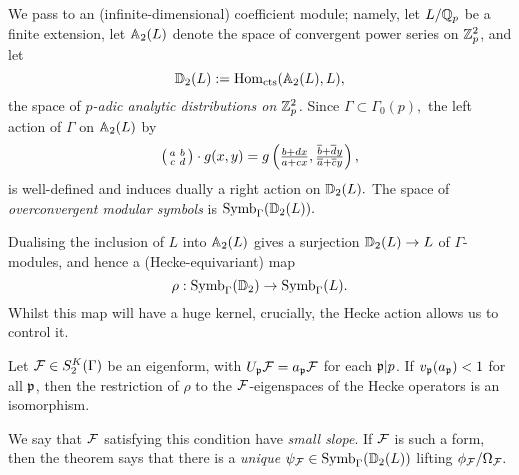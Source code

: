 \documentclass[a4paper,10pt]{article}
\numberwithin{equation}{section}
\begin{document}
We pass to an (infinite-dimensional) coefficient module; namely, let $L/\mathbb{Q}_p$ be a finite extension, let $\mathbb{A}_2(L)$ denote the space of convergent power series on $\mathbb{Z}_p^2$, and let
\[
    \mathbb{D}_2(L) := \mathrm{Hom}_{\mathrm{cts}}(\mathbb{A}_2(L),L),
\]
the space of \emph{$p$-adic analytic distributions on $\mathbb{Z}_p^2$.} Since $\Gamma \subset \Gamma_0(p),$ the left action of $\Gamma$ on $\mathbb{A}_2(L)$ by
\[
    \left(\begin{smallmatrix}a & b\\c & d\end{smallmatrix}\right) \cdot g(x,y) = g\left(\tfrac{b+dx}{a+cx}, \tfrac{\overline{b} + \overline{d}y}{\overline{a}+\overline{c}y}\right),
\]
is well-defined and induces dually a right action on $\mathbb{D}_2(L).$ The space of \emph{overconvergent modular symbols} is $\mathrm{Symb}_{\Gamma}(\mathbb{D}_2(L)).$

Dualising the inclusion of $L$ into $\mathbb{A}_2(L)$ gives a surjection $\mathbb{D}_2(L) \rightarrow L$ of $\Gamma$-modules, and hence a (Hecke-equivariant) map
\[
    \rho : \mathrm{Symb}_\Gamma(\mathbb{D}_2) \rightarrow \mathrm{Symb}_\Gamma(L).
\]
Whilst this map will have a huge kernel, crucially, the Hecke action allows us to control it.

\begin{theorem} 
Let $\mathcal{F} \in S_2^K(\Gamma)$ be an eigenform, with $U_{\mathfrak{p}}\mathcal{F} = a_{\mathfrak{p}}\mathcal{F}$ for each $\mathfrak{p}|p$. If $v_{\mathfrak{p}}(a_{\mathfrak{p}}) < 1$ for all $\mathfrak{p}$, then the restriction of $\rho$ to the $\mathcal{F}$-eigenspaces of the Hecke operators is an isomorphism.
\end{theorem}

We say that $\mathcal{F}$ satisfying this condition have \emph{small slope}. If $\mathcal{F}$ is such a form, then the theorem says that there is a \emph{unique} $\psi_{\mathcal{F}} \in \mathrm{Symb}_\Gamma(\mathbb{D}_2(L))$ lifting $\phi_{\mathcal{F}}/\Omega_{\mathcal{F}}.$

\end{document}
